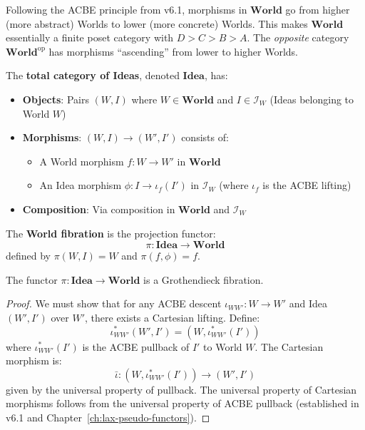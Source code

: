 \begin{remark}
Following the ACBE principle from v6.1, morphisms in $\mathbf{World}$ go from
higher (more abstract) Worlds to lower (more concrete) Worlds. This makes
$\mathbf{World}$ essentially a finite poset category with $D > C > B > A$.
The \emph{opposite} category $\mathbf{World}^{\mathrm{op}}$ has morphisms
``ascending'' from lower to higher Worlds.
\end{remark}

\begin{definition}
\label{def:total-category-ideas}
The \textbf{total category of Ideas}, denoted $\mathbf{Idea}$, has:
\begin{itemize}
  \item \textbf{Objects}: Pairs $(W, I)$ where $W \in \mathbf{World}$ and
        $I \in \mathcal{I}_W$ (Ideas belonging to World $W$)
  \item \textbf{Morphisms}: $(W, I) \to (W', I')$ consists of:
    \begin{itemize}
      \item A World morphism $f : W \to W'$ in $\mathbf{World}$
      \item An Idea morphism $\phi : I \to \iota_f(I')$ in $\mathcal{I}_W$
            (where $\iota_f$ is the ACBE lifting)
    \end{itemize}
  \item \textbf{Composition}: Via composition in $\mathbf{World}$ and $\mathcal{I}_W$
\end{itemize}
\end{definition}

\begin{definition}
\label{def:world-fibration}
The \textbf{World fibration} is the projection functor:
\[
  \pi : \mathbf{Idea} \longrightarrow \mathbf{World}
\]
defined by $\pi(W, I) = W$ and $\pi(f, \phi) = f$.
\end{definition}

\begin{proposition}
\label{prop:world-fibration-is-fibration}
The functor $\pi : \mathbf{Idea} \to \mathbf{World}$ is a Grothendieck fibration.
\end{proposition}

\begin{proof}
We must show that for any ACBE descent $\iota_{WW'} : W \to W'$ and Idea
$(W', I')$ over $W'$, there exists a Cartesian lifting. Define:
\[
  \iota_{WW'}^*(W', I') = (W, \iota_{WW'}^*(I'))
\]
where $\iota_{WW'}^*(I')$ is the ACBE pullback of $I'$ to World $W$. The
Cartesian morphism is:
\[
  \bar{\iota} : (W, \iota_{WW'}^*(I')) \longrightarrow (W', I')
\]
given by the universal property of pullback. The universal property of
Cartesian morphisms follows from the universal property of ACBE pullback
(established in v6.1 and Chapter~\ref{ch:lax-pseudo-functors}).
\end{proof}

